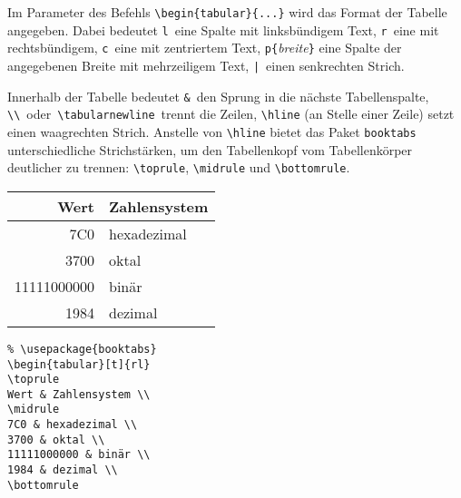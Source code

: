 Im Parameter des Befehls \lstinline|\begin{tabular}{...}| wird das
Format der Tabelle angegeben.
Dabei bedeutet
\texttt{l}~eine Spalte mit linksbündigem Text,
\texttt{r}~eine mit rechtsbündigem,
\texttt{c}~eine mit zentriertem Text,
\lstinline|p{|\textit{breite}\lstinline|}| eine Spalte der angegebenen
Breite mit mehrzeiligem Text,
\lstinline.|.~einen senkrechten Strich.
 
Innerhalb der Tabelle bedeutet
\lstinline|&|~den Sprung in die nächste Tabellenspalte,
\lstinline|\\|~oder~\lstinline|\tabularnewline|~trennt die Zeilen,
\lstinline|\hline| (an Stelle einer Zeile) setzt einen waagrechten
Strich. Anstelle von \lstinline|\hline| bietet das Paket \texttt{booktabs} unterschiedliche Strichstärken, um den Tabellenkopf vom Tabellenkörper deutlicher zu trennen: \lstinline|\toprule|, \lstinline|\midrule|  und \lstinline|\bottomrule|. 

\begingroup
\def\arraystretch{1.1} 
\vspace{0pt plus 1cm}
\exa
\begin{tabular}[t]{rl}
\toprule
Wert & Zahlensystem \\
\midrule
7C0 & hexadezimal \\
3700 & oktal \\
11111000000 & binär \\
1984 & dezimal \\
\bottomrule
\end{tabular}
\exb
\begin{verbatim}
% \usepackage{booktabs}
\begin{tabular}[t]{rl}
\toprule
Wert & Zahlensystem \\
\midrule
7C0 & hexadezimal \\
3700 & oktal \\
11111000000 & binär \\
1984 & dezimal \\
\bottomrule
\end{verbatim}
\exc
\endgroup
 
\endinput
